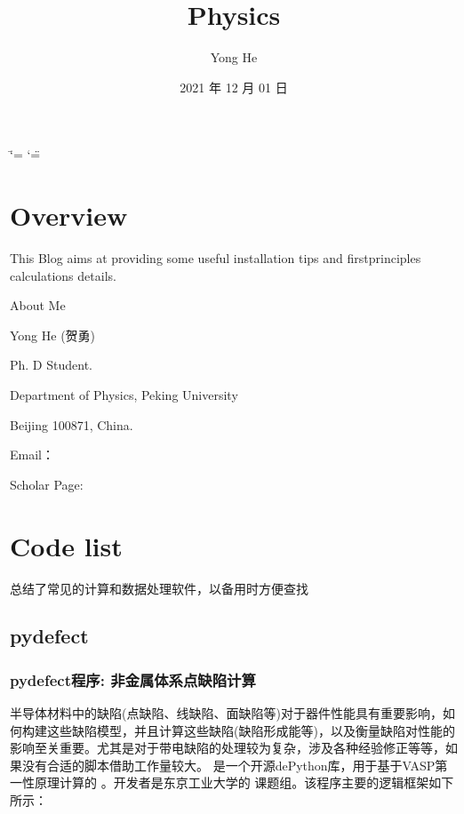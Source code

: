 \documentclass[a4paper,12pt,english]{sphinxmanual}
\title{Physics}
\date{2021 年 12 月 01 日}
\author{Yong He}
\begin{document}
\ifdefined\shorthandoff
  \ifnum\catcode`\=\string=\active\shorthandoff{=}\fi
  \ifnum\catcode`\"=\active{}\fi
\fi

\pagestyle{empty}
\sphinxmaketitle
\pagestyle{plain}
\sphinxtableofcontents
\pagestyle{normal}
\label{\detokenize{index::doc}}



\chapter{Overview}
\label{\detokenize{welcome:overview}}\label{\detokenize{welcome::doc}}
\sphinxAtStartPar
This Blog aims at providing some useful installation tips and first\sphinxhyphen{}principles calculations details.

\begin{DUlineblock}{0em}
\item[] About Me
\item[] Yong He (贺勇)
\item[] Ph. D Student.
\item[] Department of Physics, Peking University
\item[] Beijing 100871, China.
\item[] E\sphinxhyphen{}mail：
\item[] Scholar Page: 
\end{DUlineblock}


\chapter{Code list}
\label{\detokenize{code:code-list}}\label{\detokenize{code::doc}}
\sphinxAtStartPar
总结了常见的计算和数据处理软件，以备用时方便查找


\section{pydefect}
\label{\detokenize{code:pydefect}}

\subsection{pydefect程序: 非金属体系点缺陷计算}
\label{\detokenize{code/pydefect:pydefect}}\label{\detokenize{code/pydefect::doc}}
\sphinxAtStartPar
{}

\sphinxAtStartPar
半导体材料中的缺陷(点缺陷、线缺陷、面缺陷等)对于器件性能具有重要影响，如何构建这些缺陷模型，并且计算这些缺陷(缺陷形成能等)，以及衡量缺陷对性能的影响至关重要。尤其是对于带电缺陷的处理较为复杂，涉及各种经验修正等等，如果没有合适的脚本借助工作量较大。  是一个开源dePython库，用于基于VASP第一性原理计算的  。开发者是东京工业大学的  课题组。该程序主要的逻辑框架如下所示：
\end{document}
